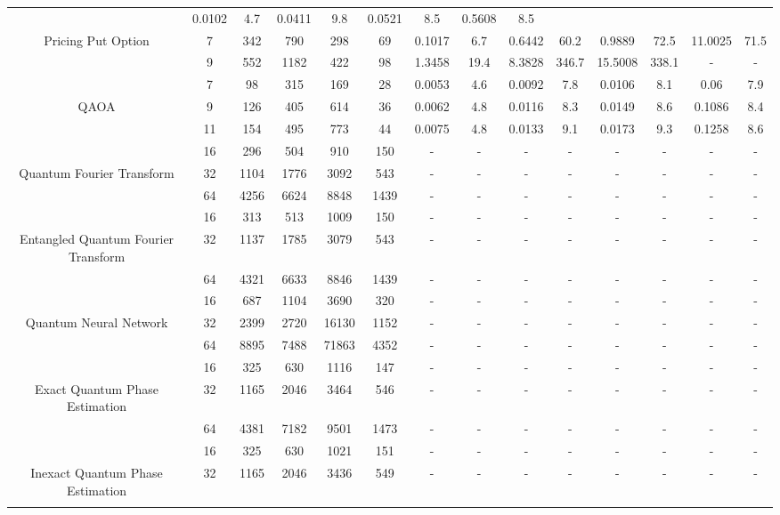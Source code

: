\begin{table}[htb]
{\begin{tabular}{|c|c|c|c|c|c|c|c|c|c|c|c|c|c|}
 & 0.0102 & 4.7
 & 0.0411 & 9.8
 & 0.0521 & 8.5
 & 0.5608 & 8.5
 \\
Pricing Put Option & 
7 & 342 & 790 & 298 & 69
 & 0.1017 & 6.7
 & 0.6442 & 60.2
 & 0.9889 & 72.5
 & 11.0025 & 71.5
 \\
 & 
9 & 552 & 1182 & 422 & 98
 & 1.3458 & 19.4
 & 8.3828 & 346.7
 & 15.5008 & 338.1
 & - & -
 \\
\hline
 & 
7 & 98 & 315 & 169 & 28
 & 0.0053 & 4.6
 & 0.0092 & 7.8
 & 0.0106 & 8.1
 & 0.06 & 7.9
 \\
QAOA & 
9 & 126 & 405 & 614 & 36
 & 0.0062 & 4.8
 & 0.0116 & 8.3
 & 0.0149 & 8.6
 & 0.1086 & 8.4
 \\
 & 
11 & 154 & 495 & 773 & 44
 & 0.0075 & 4.8
 & 0.0133 & 9.1
 & 0.0173 & 9.3
 & 0.1258 & 8.6
 \\
\hline
 & 
16 & 296 & 504 & 910 & 150
 & - & -
 & - & -
 & - & -
 & - & -
 \\
Quantum Fourier Transform & 
32 & 1104 & 1776 & 3092 & 543
 & - & -
 & - & -
 & - & -
 & - & -
 \\
 & 
64 & 4256 & 6624 & 8848 & 1439
 & - & -
 & - & -
 & - & -
 & - & -
 \\
\hline
 & 
16 & 313 & 513 & 1009 & 150
 & - & -
 & - & -
 & - & -
 & - & -
 \\
Entangled Quantum Fourier Transform & 
32 & 1137 & 1785 & 3079 & 543
 & - & -
 & - & -
 & - & -
 & - & -
 \\
 & 
64 & 4321 & 6633 & 8846 & 1439
 & - & -
 & - & -
 & - & -
 & - & -
 \\
\hline
 & 
16 & 687 & 1104 & 3690 & 320
 & - & -
 & - & -
 & - & -
 & - & -
 \\
Quantum Neural Network & 
32 & 2399 & 2720 & 16130 & 1152
 & - & -
 & - & -
 & - & -
 & - & -
 \\
 & 
64 & 8895 & 7488 & 71863 & 4352
 & - & -
 & - & -
 & - & -
 & - & -
 \\
\hline
 & 
16 & 325 & 630 & 1116 & 147
 & - & -
 & - & -
 & - & -
 & - & -
 \\
Exact Quantum Phase Estimation & 
32 & 1165 & 2046 & 3464 & 546
 & - & -
 & - & -
 & - & -
 & - & -
 \\
 & 
64 & 4381 & 7182 & 9501 & 1473
 & - & -
 & - & -
 & - & -
 & - & -
 \\
\hline
 & 
16 & 325 & 630 & 1021 & 151
 & - & -
 & - & -
 & - & -
 & - & -
 \\
Inexact Quantum Phase Estimation & 
32 & 1165 & 2046 & 3436 & 549
 & - & -
 & - & -
 & - & -
 & - & -
 \\
 & 

\end{tabular}}
\end{table}
